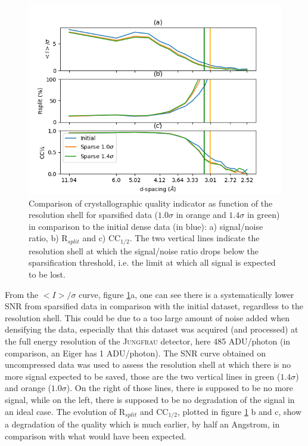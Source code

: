 \documentclass[preprint]{iucr}              %
\begin{document}
\begin{figure}
\label{f-NQO1}
\includegraphics[width=12cm]{NQO1/NQO1}
\caption{Comparison of crystallographic quality indicator as function of the resolution shell for sparsified data ($1.0\sigma$ in orange and $1.4\sigma$ in green) in comparison to the initial dense data (in blue):
a) signal/noise ratio, b) R$_{split}$ and c) CC$_{1/2}$.
The two vertical lines indicate the resolution shell at which the signal/noise ratio drops below the sparsification threshold, i.e. the limit at which all signal is expected to be lost.}

\end{figure}

From the $<I>/\sigma$ curve, figure \ref{f-NQO1}a, one can see there is a systematically lower SNR from sparsified data in comparison with the initial dataset, regardless to the resolution shell. 
This could be due to a too large amount of noise added when densifying the data, especially that this dataset was acquired (and processed) at the full energy resolution of the \textsc{Jungfrau} detector, here 485 ADU/photon (in comparison, an Eiger has 1 ADU/photon).
The SNR curve obtained on uncompressed data was used to assess the resolution shell at which there is no more signal expected to be saved, those are the two vertical lines in green ($1.4\sigma$) and 
orange ($1.0\sigma$). 
On the right of those lines, there is supposed to be no more signal, while on the left, there is supposed to be no degradation of the signal in an ideal case.
The evolution of R$_{split}$ and CC$_{1/2}$, plotted in figure \ref{f-NQO1} b and c, show a degradation 
of the quality which is much earlier, by half an Angstrom, in comparison with what would have been expected. 
\end{document}
